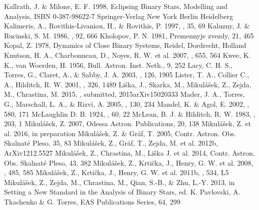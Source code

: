 \documentclass{aa}
\begin{document}
\begin{thebibliography}{}
 Kallrath, J. \& Milone, E. F. 1998, Eclipsing Binary Stars, Modelling and Analysis, ISBN 0-387-98622-7 Springer-Verlag New York Berlin Heidelberg
 Kalimeris, A., Rovithis-Livaniou, H., \& Rovithis, P. 1997, \aap, 35, 69
 Kaluzny, J. \& Rucinski, S. M. 1986, \aj, 92, 666
 Kholopov, P. N. 1981, Premennyje zvezdy, 21, 465
 Kopal, Z. 1978, Dynamics of Close Binary Systems, Reidel, Dordrecht, Holland
 Knutson, H. A., Charbonneau, D.,
    Noyes, R. W. et al. 2007, \apj, 655, 564
  Kwee, K. K., van Woerden, H. 1956, Bull. Astron. Inst. Neth., 9, 252
 Lacy, C. H. S., Torres, G., Claret, A., \& Sabby, J. A.  2003, \aj, 126, 1905
 Lister, T. A., Collier C., A., Hilditch, R. W. 2001, \mnras, 326, 1489
 Li\v{s}ka, J., Skarka, M., Mikul\'a\v{s}ek, Z., Zejda, M., Chrastina, M. 2015, \aap, submitted, 2015arXiv15020333
 Mader, J. A., Torres, G., Marschall, L. A., \& Rizvi, A. 2005, \aj, 130, 234
 Mandel, K. \& Agol, E. 2002, \apj, 580, 171
 McLaughlin D. B. 1924, \apj, 60, 22
  McLean, B. J. \& Hilditch, R. W. 1983, \mnras, 203, 1
 Mikul\'a\v{s}ek, Z. 2007, Odessa Astron. Publications, 20, 138
 Mikul\'a\v{s}ek, Z. et al. 2016, in preparation
 Mikul\'a\v{s}ek, Z. \& Gr\'af, T. 2005, Contr. Astron. Obs. Skalnat\'{e} Pleso, 35, 83
 Mikul\'a\v{s}ek, Z., Gr\'af, T., Zejda, M. et al. 2012b, ArXiv1212.5527
 Mikul\'a\v{s}ek, Z., Chrastina, M., Li\v{s}ka J. et al. 2014, Contr. Astron. Obs. Skalnat\'{e} Pleso, 43, 382
 Mikul\'a\v{s}ek, Z., Krti\v{c}ka, J., Henry, G. W. et al. 2008, \aap, 485, 585
 Mikul\'a\v{s}ek, Z., Krti\v{c}ka, J., Henry, G. W. et al. 2011b, \aap, 534, L5
 Mikul\'a\v{s}ek, Z., Zejda, M., Chrastina, M., Qian, S.-B., \& Zhu, L.-Y. 2013, in Setting a New Standard in the Analysis of Binary Stars, ed. K. Pavlovski, A. Tkachenko \& G. Torres, EAS Publications Series, 64, 299

\end{thebibliography}
\end{document}
